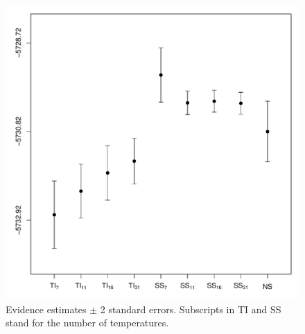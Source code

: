 \documentclass[aps,reprint,amsmath,amssymb,showpacs,showkeys]{revtex4-1}%
\newcommand{\jv}[1]{\textcolor{cyan}{JV: #1}}
\begin{document}
\begin{figure}[]
	\centering 
	\includegraphics[scale=0.45,clip=true,angle=0]{ligo_data_results.pdf}
	\caption{Evidence estimates $\pm$ 2 standard errors.  Subscripts in TI and SS stand for the number of temperatures.}
	\label{fig3}
\end{figure}





\end{document}
